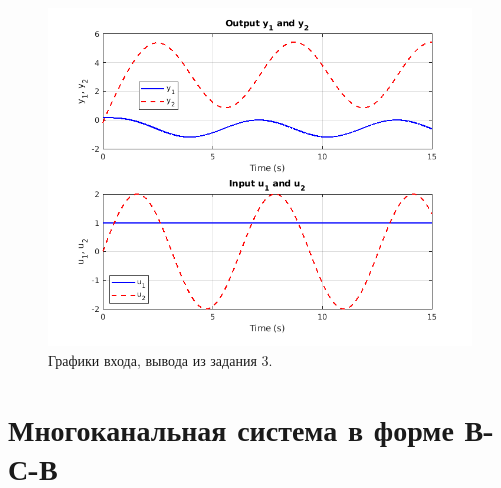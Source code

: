 \begin{figure}[htbp]
    \centering
    \includegraphics[width=1\linewidth]{figs/task_3_out.png}
    \caption{Графики входа, вывода из задания 3.}
    \label{fig:task3_out}
\end{figure}



\section{Многоканальная система в форме В-С-В}

